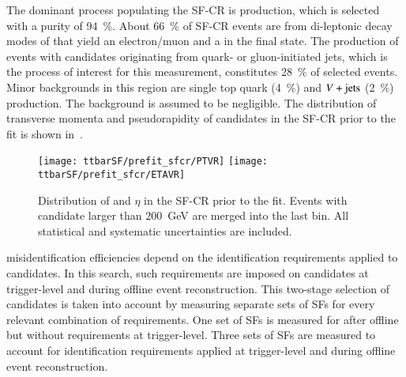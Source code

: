 The dominant process populating the SF-CR is \ttbar production, which is
selected with a purity of \SI{94}{\percent}. About \SI{66}{\percent} of SF-CR
events are from di-leptonic decay modes of \ttbar that yield an electron/muon
and a \tauhadvis in the final state. The production of \ttbar events with
\tauhadvis candidates originating from quark- or gluon-initiated jets, which is
the process of interest for this measurement, constitutes \SI{28}{\percent} of
selected events. Minor backgrounds in this region are single top quark
(\SI{4}{\percent}) and $V+\text{jets}$ (\SI{2}{\percent}) production. The \multijet
background is assumed to be negligible. The distribution of transverse momenta
and pseudorapidity of \tauhadvis candidates in the SF-CR prior to the fit is
shown in~.

\begin{figure}[htbp]
  \centering

  \texttt{[image: ttbarSF/prefit\_sfcr/PTVR]}%
  \texttt{[image: ttbarSF/prefit\_sfcr/ETAVR]}

  \caption{Distribution of \tauhadvis \pT and $\eta$ in the SF-CR prior to the
    fit. Events with \tauhadvis candidate \pT larger than \SI{200}{\GeV} are
    merged into the last bin. All statistical and systematic uncertainties are
    included.}%
  \label{fig:ttbarSF_prefit_pt}
\end{figure}

\Jettotauhadvis misidentification efficiencies depend on the identification
requirements applied to \tauhadvis candidates. In this search, such requirements
are imposed on \tauhadvis candidates at trigger-level and during offline event
reconstruction. This two-stage selection of \tauhadvis candidates is taken into
account by measuring separate sets of SFs for every relevant combination of
\tauid requirements. One set of SFs is measured for \faketauhadvis after offline
\tauid but without requirements at trigger-level.
Three sets of SFs are measured to account for identification requirements
applied at trigger-level and during offline event reconstruction.

